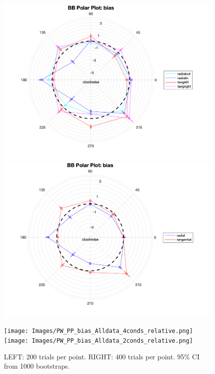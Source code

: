 \documentclass[11pt]{article} %
\begin{document}
\begin{figure}[H]
\centering %
\includegraphics[scale=.3]{Images/BB_PP_bias_Alldata_4conds.png}
\includegraphics[scale=.3]{Images/BB_PP_bias_Alldata_2conds.png}
\end{figure}
\begin{figure}[H]
\centering %
\texttt{[image: Images/PW\_PP\_bias\_Alldata\_4conds\_relative.png]}
\texttt{[image: Images/PW\_PP\_bias\_Alldata\_2conds\_relative.png]}
\caption{LEFT: 200 trials per point. RIGHT: 400 trials per point. 95\% CI from 1000 bootstraps.}
\end{figure}

\newpage
\end{document}
